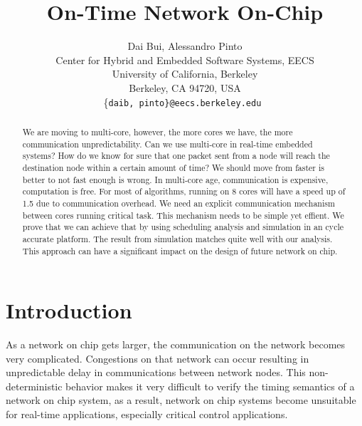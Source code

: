 \documentclass[conference, twocolumn]{IEEEtran}
\theoremstyle{definition}
\begin{document}
\title{On-Time Network On-Chip}

\author{Dai Bui, Alessandro Pinto \\
	Center for Hybrid and Embedded Software Systems, EECS \\
    University of California, Berkeley \\
    Berkeley, CA 94720, USA \\
    \{\tt daib, pinto\}@eecs.berkeley.edu
}

\maketitle

\begin{abstract}
We are moving to multi-core, however, the more cores we have, the more
communication unpredictability. Can we use multi-core in real-time embedded
systems? How do we know for sure that one packet sent from a node will reach
the destination node within a certain amount of time? We should move from
faster is better to not fast enough is wrong. In multi-core age, communication
is expensive, computation is free. For most of algorithms, running on 8 cores
will have a speed up of 1.5 due to communication overhead. We need an explicit
communication mechanism between cores running critical task. This mechanism
needs to be simple yet effient. We prove that we can achieve that by using scheduling
analysis and simulation in an cycle accurate platform. The result from
simulation matches quite well with our analysis. This approach can have a
significant impact on the design of future network on chip.

\end{abstract}

\section{Introduction}
As a network on chip gets larger, the communication on the network becomes 
very complicated. Congestions on that network can occur resulting in unpredictable 
delay in communications between network nodes. This non-deterministic behavior 
makes it very difficult to verify the timing semantics of a network on chip 
system, as a result, network on chip systems become unsuitable for real-time 
applications, especially critical control applications.
\end{document}
